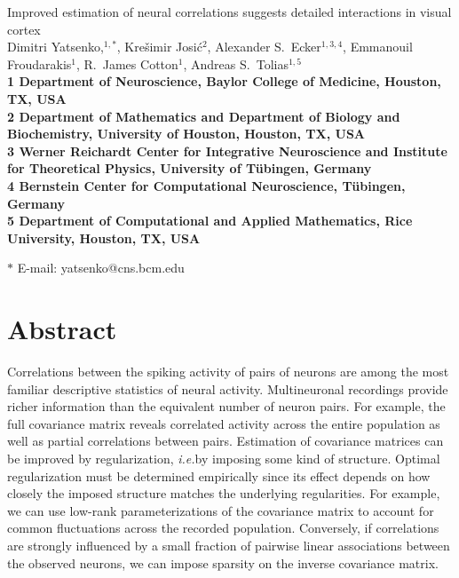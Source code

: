 \documentclass[10pt]{article}
\date{}
\begin{document}
\begin{flushleft}
{\Large
Improved estimation of neural correlations suggests detailed interactions in visual cortex
}
\\
Dimitri Yatsenko,$^{1,\ast}$, 
Kre\v{s}imir Josi\'{c}$^{2}$,
Alexander S.~Ecker$^{1,3,4}$,
Emmanouil Froudarakis$^{1}$,
R.~James Cotton$^{1}$,
Andreas S.~Tolias$^{1,5}$
\\
\bf{1} Department of Neuroscience, Baylor College of Medicine, Houston, TX, USA
\\
\bf{2} Department of Mathematics and Department of Biology and Biochemistry, University of Houston, Houston, TX, USA
\\
\bf{3}  Werner Reichardt Center for Integrative Neuroscience and Institute for Theoretical Physics, University of T\"ubingen, Germany
\\
\bf{4} Bernstein Center for Computational Neuroscience, T\"ubingen, Germany
\\
\bf{5} Department of Computational and Applied Mathematics, Rice University, Houston, TX, USA

$\ast$ E-mail: yatsenko@cns.bcm.edu
\end{flushleft}

\section*{Abstract}
Correlations between the spiking activity of pairs of neurons are among the most familiar descriptive statistics of neural activity.
Multineuronal recordings provide richer information than the equivalent number of neuron pairs.
For example, the full covariance  matrix reveals correlated activity across the entire population as well as partial correlations between pairs.
Estimation of covariance matrices can be improved by regularization, \emph{i.e.}\;by imposing some kind of structure.
Optimal regularization must be determined empirically since its effect depends on how closely the imposed structure matches the underlying regularities.
For example, we can use low-rank parameterizations of the covariance matrix to account for common fluctuations across the recorded population.
Conversely, if correlations are strongly influenced by a small fraction of pairwise linear associations between the observed neurons, we can impose sparsity on the inverse covariance matrix.
\end{document}
